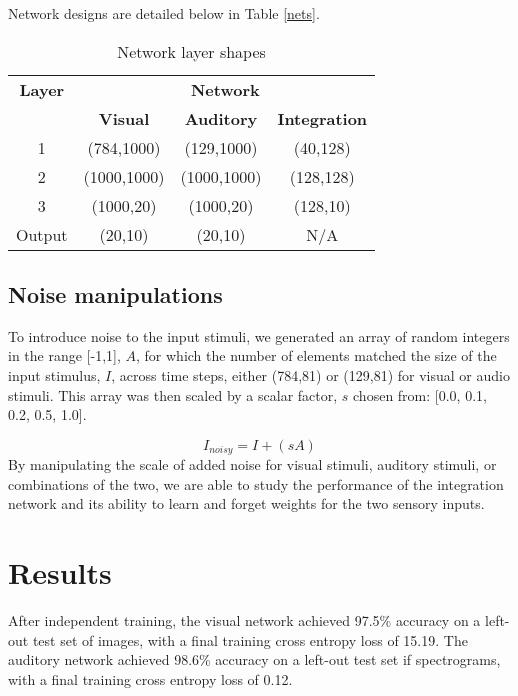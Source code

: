 \documentclass[conference]{IEEEtran}
\begin{document}
Network designs are detailed below in Table \ref{nets}.

\begin{table}[htbp]
\caption{Network layer shapes}
\begin{center}\label{nets}
\begin{tabular}{|c|c|c|c|}
\hline
\textbf{Layer}&\multicolumn{3}{|c|}{\textbf{Network}} \\
\cline{2-4} 
& \textbf{Visual}& \textbf{Auditory}& \textbf{Integration} \\
\hline
1 & (784,1000) & (129,1000) & (40,128) \\
2 & (1000,1000) & (1000,1000) & (128,128)\\
3 & (1000,20) & (1000,20) & (128,10)\\
Output & (20,10) & (20,10) & N/A\\
\hline
\end{tabular}
\label{tab1}
\end{center}
\end{table}

\subsection{Noise manipulations}
To introduce noise to the input stimuli, we generated an array of random integers in the range [-1,1], $A$, for which the number of elements matched the size of the input stimulus, $I$, across time steps, either (784,81) or (129,81) for visual or audio stimuli. This array was then scaled by a scalar factor, $s$ chosen from: [0.0, 0.1, 0.2, 0.5, 1.0].

\begin{equation}
I_{noisy} = I + (sA)
\end{equation}
By manipulating the scale of added noise for visual stimuli, auditory stimuli, or combinations of the two, we are able to study the performance of the integration network and its ability to learn and forget weights for the two sensory inputs.

\section{Results}
After independent training, the visual network achieved 97.5\% accuracy on a left-out test set of images, with a final training cross entropy loss of 15.19. The auditory network achieved 98.6\% accuracy on a left-out test set if spectrograms, with a final training cross entropy loss of 0.12.
\end{document}
